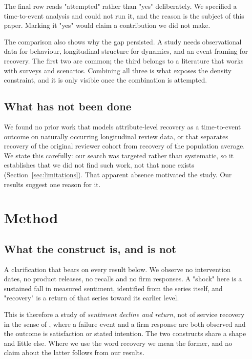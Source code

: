 \documentclass[11pt,a4paper]{article}
\makeatletter
\let\original@section\section
\renewcommand{\section}{\FloatBarrier\original@section}%
\let\original@subsection\subsection
\renewcommand{\subsection}{\FloatBarrier\original@subsection}%
\makeatother
\begin{document}
The final row reads "attempted" rather than "yes" deliberately. We specified a
time-to-event analysis and could not run it, and the reason is the subject of
this paper. Marking it "yes" would claim a contribution we did not make.

The comparison also shows why the gap persisted. A study needs observational
data for behaviour, longitudinal structure for dynamics, and an event framing
for recovery. The first two are common; the third belongs to a literature that
works with surveys and scenarios. Combining all three is what exposes the
density constraint, and it is only visible once the combination is attempted.

\subsection{What has not been done}
\label{sec:gap}

We found no prior work that models attribute-level recovery as a time-to-event
outcome on naturally occurring longitudinal review data, or that separates
recovery of the original reviewer cohort from recovery of the population
average. We state this carefully: our search was targeted rather than
systematic, so it establishes that we did not find such work, not that none
exists (Section~\ref{sec:limitations}). That apparent absence motivated the
study. Our results suggest one reason for it.

\section{Method}

\subsection{What the construct is, and is not}
\label{sec:construct}

A clarification that bears on every result below. We observe no intervention
dates, no product releases, no recalls and no firm responses. A "shock" here is
a sustained fall in measured sentiment, identified from the series itself, and
"recovery" is a return of that series toward its earlier level.

This is therefore a study of \emph{sentiment decline and return}, not of
service recovery in the sense of \citet{dematos2007}, where a failure event and
a firm response are both observed and the outcome is satisfaction or stated
intention. The two constructs share a shape and little else. Where we use the
word recovery we mean the former, and no claim about the latter follows from
our results.
\end{document}
